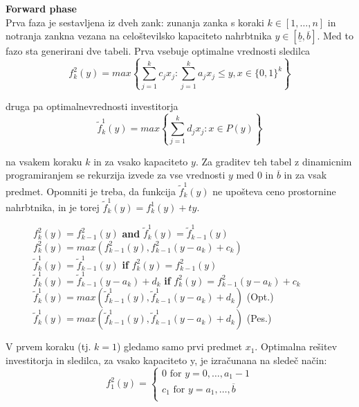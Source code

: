 \documentclass[a4paper, 11pt]{article}
\begin{document}
	\textbf{Forward phase} \\
	Prva faza je sestavljena iz dveh zank: zunanja zanka s koraki $k \in \left[1, \dots , n \right]$ in notranja zankna vezana na celoštevilsko kapaciteto nahrbtnika $y \in \left[ \underline{b}, \overline{b} \right]$. Med to fazo sta generirani dve tabeli. Prva vsebuje optimalne vrednosti sledilca
	$$ f^{2}_{k}(y) = max \left\{ \sum_{j=1}^{k} c_j x_j : \sum_{j=1}^{k} a_j x_j \leq y, x \in \{0, 1\}^k \right\} $$
	
	druga pa optimalnevrednosti investitorja
	$$ \widetilde{f}^{1}_{k}(y) = max \left\{ \sum_{j=1}^{k} d_j x_j : x \in P(y) \right\} $$
	
	na vsakem koraku $k$ in za vsako kapaciteto $y$. Za graditev teh tabel z dinamicnim programiranjem se rekurzija izvede za vse vrednosti $y$ med $0$ in $\overline{b}$ in za vsak predmet. Opomniti je treba, da funkcija  $\widetilde{f}^{1}_{k}(y)$ ne upošteva ceno prostornine nahrbtnika, in je torej   $\widetilde{f}^{1}_{k}(y) = f^{1}_{k}(y)+ty$. \\

	\begin{figure}[ht]
  	\centering
  		\begin{minipage}{0.9\linewidth}
			\begin{algorithmic}[1]
						\STATE $f_{k}^{2}(y) = f_{k-1}^{2}(y)$ \textbf{and} $\widetilde{f}_{k}^{1}(y) = \widetilde{f}_{k-1}^{1}(y)$
					\ELSE
						\STATE $f_{k}^{2}(y) = max( f_{k-1}^{2}(y), f_{k-1}^{2}(y - a_k) + c_k)$
							\STATE $\widetilde{f}^{1}_{k}(y) = \widetilde{f}^{1}_{k-1}(y)$ \textbf{if} $f_{k}^{2}(y) = f_{k-1}^{2}(y)$
							\STATE $\widetilde{f}^{1}_{k}(y) = \widetilde{f}^{1}_{k-1}(y-a_k) + d_k$ \textbf{if} $f_{k}^{2}(y) = f_{k-1}^{2}(y - a_k) + c_k$
						\ELSE
							\STATE $\widetilde{f}^{1}_{k}(y) = max(\widetilde{f}^{1}_{k-1}(y), \widetilde{f}^{1}_{k-1}(y-a_k) + d_k)$ (Opt.)
							\STATE $\widetilde{f}^{1}_{k}(y) = max(\widetilde{f}^{1}_{k-1}(y), \widetilde{f}^{1}_{k-1}(y-a_k) + d_k)$ (Pes.)
						\ENDIF
					\ENDIF
				\ENDFOR
			\end{algorithmic}
		\end{minipage}
	\end{figure}
	
	V prvem koraku (tj. $k=1$) gledamo samo prvi predmet $x_1$. Optimalna rešitev investitorja in sledilca, za vsako kapaciteto y, je izračunana na sledeč način:
	\[   
	\text{$f_{1}^{2}(y) =$}
    	\begin{cases}
	 	\text{0 for $y = 0, \dots, a_1 - 1$} \\
       		\text{$c_1$ for $y = a_1, \dots, \overline{b}$} \\
    	\end{cases}
	\]
	
\end{document}
